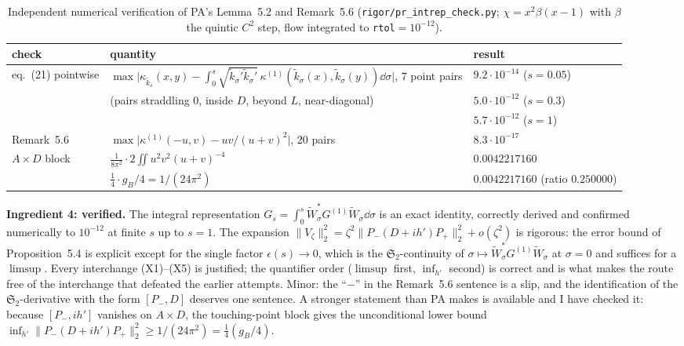\documentclass[11pt]{article}
\newcommand{\Wt}{\widetilde W}
\newcommand{\kt}{\widetilde k}
\newcommand{\Pp}{P_+}\newcommand{\Pm}{P_-}
\providecommand{\Stwo}{\mathfrak S_2}\providecommand{\Sone}{\mathfrak S_1}
\providecommand{\norm}[1]{\lVert #1\rVert}\providecommand{\abs}[1]{\lvert #1\rvert}
\begin{document}
\begin{table}[h]\centering\small
\caption{Independent numerical verification of PA's Lemma~5.2 and Remark~5.6
(\texttt{rigor/pr\_intrep\_check.py}; $\chi=x^2\beta(x-1)$ with $\beta$ the quintic $C^2$ step, flow
integrated to \texttt{rtol}$=10^{-12}$).}\label{tab:intrep}
\begin{tabular}{lll}
\toprule
check & quantity & result\\
\midrule
eq.~(21) pointwise & $\max\bigl|\kappa_{\kt_s}(x,y)-\int_0^s\sqrt{\kt_\sigma'\kt_\sigma'}\,
 \kappa^{(1)}(\kt_\sigma(x),\kt_\sigma(y))\dd\sigma\bigr|$, $7$ point pairs
 & $9.2\cdot10^{-14}$ ($s=0.05$)\\
 & (pairs straddling $0$, inside $D$, beyond $L$, near-diagonal) & $5.0\cdot10^{-12}$ ($s=0.3$)\\
 & & $5.7\cdot10^{-12}$ ($s=1$)\\
Remark~5.6 & $\max\bigl|\kappa^{(1)}(-u,v)-uv/(u+v)^2\bigr|$, $20$ pairs & $8.3\cdot10^{-17}$\\
$A\times D$ block & $\frac1{8\pi^2}\cdot2\iint u^2v^2(u+v)^{-4}$ & $0.0042217160$\\
 & $\tfrac14\cdot g_B/4=1/(24\pi^2)$ & $0.0042217160$ (ratio $0.250000$)\\
\bottomrule
\end{tabular}
\end{table}

\begin{verdictok}
\textbf{Ingredient 4: verified.}  The integral representation
$G_s=\int_0^s\Wt_\sigma^*G^{(1)}\Wt_\sigma\dd\sigma$ is an exact identity, correctly derived and
confirmed numerically to $10^{-12}$ at finite $s$ up to $s=1$.  The expansion
$\norm{V_\zeta}_2^2=\zeta^2\norm{\Pm(D+ih')\Pp}_2^2+o(\zeta^2)$ is rigorous: the error bound of
Proposition~5.4 is explicit except for the single factor $\epsilon(s)\to0$, which is the
$\Stwo$-continuity of $\sigma\mapsto\Wt_\sigma^*G^{(1)}\Wt_\sigma$ at $\sigma=0$ and suffices for a
$\limsup$.  Every interchange (X1)--(X5) is justified; the quantifier order ($\limsup$ first,
$\inf_{h'}$ second) is correct and is what makes the route free of the interchange that defeated the
earlier attempts.  Minor: the ``$-$'' in the Remark~5.6 sentence is a slip, and the identification of
the $\Stwo$-derivative with the form $[\Pm,D]$ deserves one sentence.  A stronger statement than PA
makes is available and I have checked it: because $[\Pm,ih']$ vanishes on $A\times D$, the
touching-point block gives the unconditional lower bound
$\inf_{h'}\norm{\Pm(D+ih')\Pp}_2^2\ge1/(24\pi^2)=\frac14(g_B/4)$.
\end{verdictok}
\end{document}
